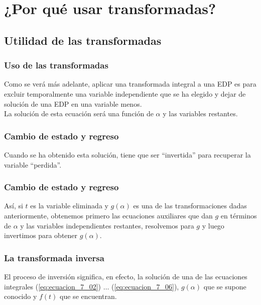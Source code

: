 \documentclass[12pt]{beamer}
\begin{document}
\section{¿Por qué usar transformadas?}
\subsection{Utilidad de las transformadas}

\begin{frame}
\frametitle{Uso de las transformadas}
Como se verá más adelante, aplicar una transformada integral a una EDP es para excluir temporalmente una variable independiente que se ha elegido y dejar de solución de una EDP en una variable menos.
\\
\bigskip
\pause
La solución de esta ecuación será una función de $\alpha$ y las variables restantes.
\end{frame}
\begin{frame}
\frametitle{Cambio de estado y regreso}
Cuando se ha obtenido esta solución, tiene que ser \enquote{invertida} para recuperar la variable \enquote{perdida}.
\end{frame}
\begin{frame}
\frametitle{Cambio de estado y regreso}
Así, si $t$ es la variable eliminada y $g (\alpha)$ es una de las transformaciones dadas anteriormente, \pause obtenemos primero las ecuaciones auxiliares que dan $g$ en términos de $\alpha$ y las variables independientes restantes, resolvemos para $g$ y luego invertimos para obtener $g (\alpha)$.
\end{frame}
\begin{frame}
\frametitle{La transformada inversa}
El proceso de inversión significa, en efecto, la solución de una de las ecuaciones integrales (\ref{eq:ecuacion_7_02}) $\ldots$ (\ref{eq:ecuacion_7_06}), $g (\alpha)$ que se supone conocido y $f (t)$ que se encuentran.
\end{frame}
\end{document}
